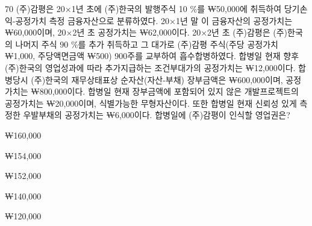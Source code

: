 \begin{question}{70}
(주)감평은 20×1년 초에 (주)한국의 발행주식 10 \%를 ₩50,000에 취득하여 당기손익-공정가치 측정 금융자산으로 분류하였다. 20×1년 말 이 금융자산의 공정가치는 ₩60,000이며, 20×2년 초 공정가치는 ₩62,000이다. 20×2년 초 (주)감평은 (주)한국의 나머지 주식 90 \%를 추가 취득하고 그 대가로 (주)감평 주식(주당 공정가치 ₩1,000, 주당액면금액 ₩500) 900주를 교부하여 흡수합병하였다. 합병일 현재 향후
(주)한국의 영업성과에 따라 추가지급하는 조건부대가의 공정가치는 ₩12,000이다. 합병당시 (주)한국의 재무상태표상 순자산(자산-부채) 장부금액은 ₩600,000이며, 공정가치는 ₩800,000이다. 합병일 현재 장부금액에 포함되어 있지 않은 개발프로젝트의 공정가치는 ₩20,000이며, 식별가능한 무형자산이다. 또한 합병일 현재 신뢰성 있게 측정한 우발부채의 공정가치는 ₩6,000이다. 합병일에 (주)감평이 인식할 영업권은? \par
\begin{choices}
  \item ₩160,000
  \item ₩154,000
  \item ₩152,000
  \item ₩140,000
  \item ₩120,000
\end{choices}
\end{question}
